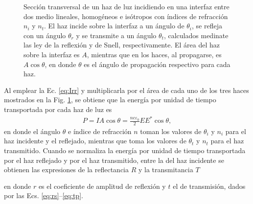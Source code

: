 \begin{figure}[h]
	\caption{Sección transversal de un haz de luz incidiendo en una interfaz entre dos medio lineales, homogéneos e isótropos con índices de refracción $n_i$ y $n_t$. El haz incide sobre la interfaz a un ángulo de $\theta_i$, se refleja con un ángulo $\theta_r$ y se transmite a un ángulo $\theta_t$, calculados medinate las ley de la reflexión y de Snell, respectivamente. El área del haz sobre la interfaz es $A$, mientras que en los haces, al propagarse, es $A\cos\theta$, en donde $\theta$ es el ángulo de propagación respectivo para cada haz.} \label{fig:hazcircular}
	\end{figure}

 Al emplear la Ec. \eqref{eq:Irr} y multiplicarla por el área de cada uno de los tres haces mostrados en la Fig. \ref{fig:hazcircular}, se obtiene que la energía por unidad de tiempo transportada por cada haz de luz es
	\begin{align*}
	P = I A \cos\theta = \frac{n c \varepsilon_0}{2}  EE^* \cos\theta,
	\end{align*}
en donde el ángulo $\theta$ e índice de refracción $n$ toman los valores de $\theta_i$ y $n_i$ para el haz incidente y el reflejado, mientras que  toma los valores de $\theta_t$ y  $n_t$ para el haz transmitido. Cuando se normaliza la energía por unidad de tiempo transportada por el haz reflejado y por el haz transmitido, entre la del haz incidente se obtienen las expresiones de la reflectancia $R$ y la transmitancia $T$ \cite{hecht1998optics} \vspace{-.5em} 
	\begin{tcolorbox}[title = Reflectancia y transmitancia]
	\end{tcolorbox}\vspace*{-.75em}\noindent	
en donde $r$ es el coeficiente de amplitud de reflexión y $t$ el de transmisión, dados por las Ecs. \eqref{eq:rs}--\eqref{eq:tp}.

